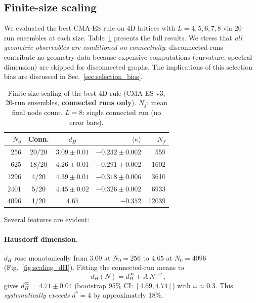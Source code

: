\documentclass[aps,prd,twocolumn,superscriptaddress,floatfix]{revtex4-2}
\begin{document}
\subsection{Finite-size scaling}
\label{sec:scaling}

We evaluated the best CMA-ES rule on 4D lattices with
$L = 4, 5, 6, 7, 8$ via 20-run ensembles at each size.
Table~\ref{tab:scaling} presents the full results.  We
stress that \emph{all geometric observables are conditioned
on connectivity}: disconnected runs contribute no geometry
data because expensive computations (curvature, spectral
dimension) are skipped for disconnected graphs.  The
implications of this selection bias are discussed in
Sec.~\ref{sec:selection_bias}.

\begin{table}[htbp]
  \centering
  \caption{Finite-size scaling of the best 4D rule (CMA-ES v3,
    20-run ensembles, \textbf{connected runs only}).
    $N_f$: mean final node count.
    $L\!=\!8$: single connected run (no error bars).}
  \label{tab:scaling}
  \small
  \begin{tabular}{rccrr}
    \toprule
    $N_0$ & Conn. & $d_H$ &
      $\langle\kappa\rangle$ & $N_f$ \\
    \midrule
    256  & 20/20 & $3.09 \pm 0.01$ &
      $-0.232 \pm 0.002$ & 559 \\
    625  & 18/20 & $4.26 \pm 0.01$ &
      $-0.291 \pm 0.002$ & 1602 \\
    1296 & \phantom{0}4/20 & $4.39 \pm 0.01$ &
      $-0.318 \pm 0.006$ & 3610 \\
    2401 & \phantom{0}5/20 & $4.45 \pm 0.02$ &
      $-0.326 \pm 0.002$ & 6933 \\
    4096 & \phantom{0}1/20 & $4.65$ &
      $-0.352$ & 12039 \\
    \bottomrule
  \end{tabular}
\end{table}

Several features are evident:

\paragraph{Hausdorff dimension.}
$d_H$ rose monotonically from $3.09$ at $N_0\!=\!256$ to $4.65$
at $N_0\!=\!4096$ (Fig.~\ref{fig:scaling_dH}).  Fitting the
connected-run means to
\begin{equation}
  d_H(N) = d_H^\infty + A\, N^{-\omega} \,,
\label{eq:power_law}
\end{equation}
gives $d_H^\infty = 4.71 \pm 0.04$ (bootstrap 95\% CI:
$[4.69, 4.74]$) with $\omega \approx 0.3$.
This \emph{systematically exceeds} $d^* = 4$ by approximately
18\%.
\end{document}
